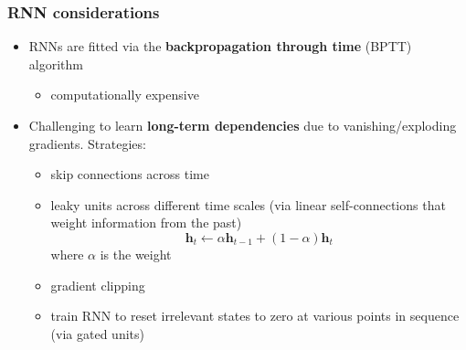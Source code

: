 \documentclass[smaller]{beamer}
\begin{document}
\begin{frame}
  \frametitle{RNN considerations}
  \pause

  \begin{itemize}
  \item RNNs are fitted via the \textbf{backpropagation through time} (BPTT) algorithm
    \begin{itemize}
    \item computationally expensive
    \end{itemize}
    \pause
  \item Challenging to learn \textbf{long-term dependencies} due to vanishing/exploding gradients. \pause Strategies:
    \pause
    \begin{itemize}
    \item skip connections across time \pause
    \item leaky units across different time scales (via linear self-connections that weight information from the
      past)\pause
      \begin{equation}
        \bm{h}_{t} \leftarrow \alpha\bm{h}_{t-1} + (1-\alpha)\bm{h}_{t}
      \end{equation}\pause
      where $\alpha$ is the weight
      \item gradient clipping\pause
      \item train RNN to reset irrelevant states to zero at various points in sequence (via gated units)
      \end{itemize}
    \end{itemize}
    
  \end{frame}
\end{document}
